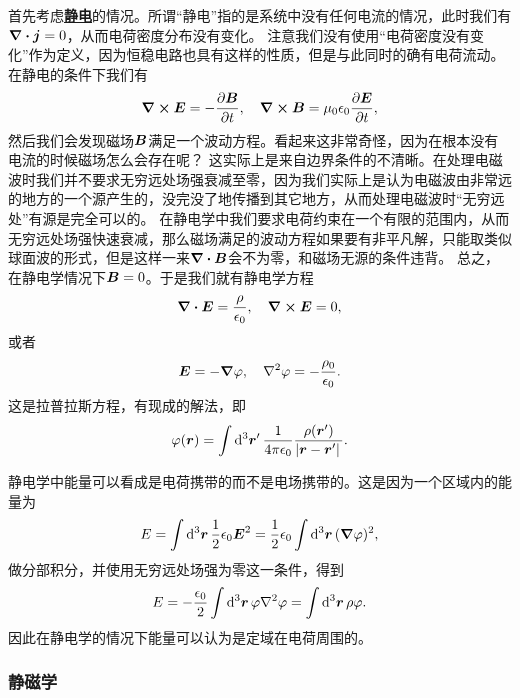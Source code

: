\documentclass[UTF8, a4paper]{ctexart}
\newcommand*{\concept}[1]{\underline{\textbf{#1}}}
\begin{document}
首先考虑\concept{静电}的情况。所谓“静电”指的是系统中没有任何电流的情况，此时我们有$\div{\vb*{j}}=0$，从而电荷密度分布没有变化。
注意我们没有使用“电荷密度没有变化”作为定义，因为恒稳电路也具有这样的性质，但是与此同时的确有电荷流动。
在静电的条件下我们有
\[
    \curl{\vb*{E}} = - \pdv{\vb*{B}}{t}, \quad \curl{\vb*{B}} = \mu_0 \epsilon_0 \pdv{\vb*{E}}{t},
\]
然后我们会发现磁场$\vb*{B}$满足一个波动方程。看起来这非常奇怪，因为在根本没有电流的时候磁场怎么会存在呢？
这实际上是来自边界条件的不清晰。在处理电磁波时我们并不要求无穷远处场强衰减至零，因为我们实际上是认为电磁波由非常远的地方的一个源产生的，没完没了地传播到其它地方，从而处理电磁波时“无穷远处”有源是完全可以的。
在静电学中我们要求电荷约束在一个有限的范围内，从而无穷远处场强快速衰减，那么磁场满足的波动方程如果要有非平凡解，只能取类似球面波的形式，但是这样一来$\div{\vb*{B}}$会不为零，和磁场无源的条件违背。
总之，在静电学情况下$\vb*{B}=0$。于是我们就有静电学方程
\begin{equation}
    \div{\vb*{E}} = \frac{\rho}{\epsilon_0}, \quad \curl{\vb*{E}} = 0,
    \label{eq:static-e-field}
\end{equation}
或者
\begin{equation}
    \vb*{E} = - \grad{\varphi}, \quad \laplacian{\varphi} = - \frac{\rho_0}{\epsilon_0}.
    \label{eq:static-phi-field}
\end{equation}
这是拉普拉斯方程，有现成的解法，即
\begin{equation}
    \varphi(\vb*{r}) = \int \dd[3]{\vb*{r}'} \frac{1}{4\pi \epsilon_0} \frac{\rho(\vb*{r}')}{\abs*{\vb*{r} - \vb*{r}'}}.
    \label{eq:from-q-to-phi}
\end{equation}

静电学中能量可以看成是电荷携带的而不是电场携带的。这是因为一个区域内的能量为
\[
    E = \int \dd[3]{\vb*{r}} \frac{1}{2} \epsilon_0 \vb*{E}^2 = \frac{1}{2} \epsilon_0 \int \dd[3]{\vb*{r}} (\grad{\varphi})^2,
\]
做分部积分，并使用无穷远处场强为零这一条件，得到
\begin{equation}
    E = - \frac{\epsilon_0}{2} \int \dd[3]{\vb*{r}} \varphi \laplacian{\varphi} = \int \dd[3]{\vb*{r}} \rho \varphi.
\end{equation}
因此在静电学的情况下能量可以认为是定域在电荷周围的。

\subsubsection{静磁学}
\end{document}

